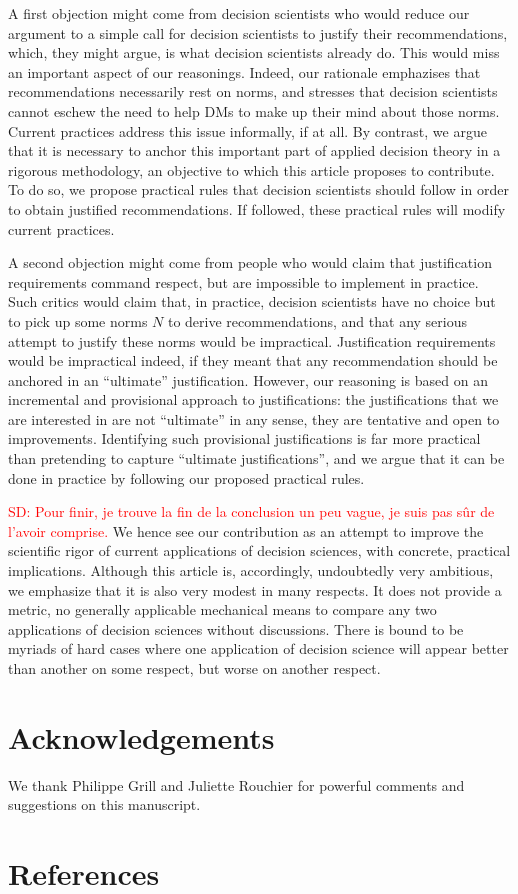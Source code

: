 \documentclass[preprint, french, english, 11pt, authoryear]{elsarticle}%
\newcommand{\commentSD}[1]{\textcolor{red}{SD: #1}}
\begin{document}
A first objection might come from decision scientists who would reduce our argument to a simple call for decision scientists to justify their recommendations, which, they might argue, is what decision scientists already do. This would miss an important aspect of our reasonings. Indeed, our rationale emphazises that recommendations necessarily rest on norms, and stresses that decision scientists cannot eschew the need to help \acp{DM} to make up their mind about those norms. Current practices address this issue informally, if at all. By contrast, we argue that it is necessary to anchor this important part of applied decision theory in a rigorous methodology, an objective to which this article proposes to contribute. To do so, we propose practical rules that decision scientists should follow in order to obtain justified recommendations. If followed, these practical rules will modify current practices.

A second objection might come from people who would claim that justification requirements command respect, but are impossible to implement in practice. Such critics would claim that, in practice, decision scientists have no choice but to pick up some norms $N$ to derive recommendations, and that any serious attempt to justify these norms would be impractical. Justification requirements would be impractical indeed, if they meant that any recommendation should be anchored in an “ultimate” justification. However, our reasoning is based on an incremental and provisional approach to justifications: the justifications that we are interested in are not ``ultimate'' in any sense, they are tentative and open to improvements. Identifying such provisional justifications is far more practical than pretending to capture ``ultimate justifications'', and we argue that it can be done in practice by following our proposed practical rules.

\commentSD{Pour finir, je trouve la fin de la conclusion un peu vague, je suis pas sûr de l'avoir comprise.}
We hence see our contribution as an attempt to improve the scientific rigor of current applications of decision sciences, with concrete, practical implications. Although this article is, accordingly, undoubtedly very ambitious, we emphasize that it is also very modest in many respects. It does not provide a metric, no generally applicable mechanical means to compare any two applications of decision sciences without discussions. There is bound to be myriads of hard cases where one application of decision science will appear better than another on some respect, but worse on another respect.

\setcounter{secnumdepth}{0}
\section{Acknowledgements}
We thank Philippe Grill and Juliette Rouchier for powerful comments and suggestions on this manuscript.

\section{References}

\end{document}
